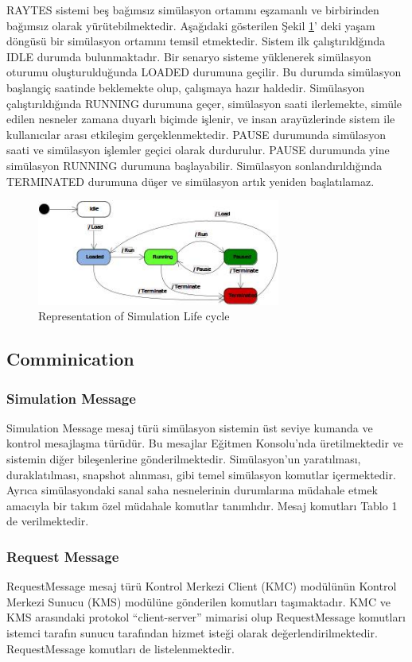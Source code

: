 \documentclass[conference]{IEEEtran}
\begin{document}
RAYTES sistemi beş bağımsız simülasyon ortamını eşzamanlı ve birbirinden bağımsız olarak yürütebilmektedir. Aşağıdaki gösterilen Şekil \ref{fig:simyasamdongusu}' deki yaşam döngüsü bir simülasyon ortamını temsil etmektedir. Sistem ilk çalıştırıldğında IDLE durumda bulunmaktadır. Bir senaryo sisteme yüklenerek simülasyon oturumu oluşturulduğunda LOADED durumuna geçilir. Bu durumda simülasyon başlangiç saatinde beklemekte olup, çalışmaya hazır haldedir. Simülasyon çalıştırıldığında RUNNING durumuna geçer, simülasyon saati ilerlemekte, simüle edilen nesneler zamana duyarlı biçimde işlenir, ve insan arayüzlerinde sistem ile kullanıcılar arası etkileşim gerçeklenmektedir. PAUSE durumunda simülasyon saati ve simülasyon işlemler geçici olarak durdurulur. PAUSE durumunda yine simülasyon RUNNING durumuna başlayabilir. Simülasyon sonlandırıldığında TERMINATED durumuna düşer ve simülasyon artık yeniden başlatılamaz.




\begin{figure}[h!]
  \centering
  \includegraphics[width=8cm]{simyasamdongusu.jpg}
  \caption{Representation of Simulation Life cycle}\label{fig:simyasamdongusu}
\end{figure}

\subsection{Comminication}
\subsubsection{ Simulation Message}
Simulation Message mesaj türü simülasyon sistemin üst seviye kumanda ve kontrol mesajlaşma türüdür. Bu mesajlar Eğitmen Konsolu’nda üretilmektedir ve sistemin diğer bileşenlerine gönderilmektedir. Simülasyon’un yaratılması, duraklatılması, snapshot alınması, gibi temel simülasyon komutlar içermektedir. Ayrıca simülasyondaki sanal saha nesnelerinin durumlarına müdahale etmek amacıyla bir takım özel müdahale komutlar tanımlıdır. Mesaj komutları Tablo 1 de verilmektedir.
\subsubsection{Request Message}
RequestMessage mesaj türü Kontrol Merkezi Client (KMC) modülünün Kontrol Merkezi Sunucu (KMS) modülüne gönderilen komutları taşımaktadır. KMC ve KMS arasındaki protokol “client-server” mimarisi olup RequestMessage komutları istemci tarafın sunucu tarafından hizmet isteği olarak değerlendirilmektedir. RequestMessage komutları de listelenmektedir.
\end{document}
